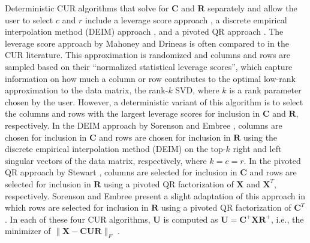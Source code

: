 \documentclass[12pt]{article}
\begin{document}
Deterministic CUR algorithms that solve for $\mathbf{C}$ and $\mathbf{R}$ separately and allow the user to select $c$ and $r$ include a leverage score approach \cite{mahoney_drineas_2009}, a discrete empirical interpolation method (DEIM) approach \cite{sorenson_embree_2016}, and a pivoted QR approach \cite{stewart_1999}.  The leverage score approach by Mahoney and Drineas \cite{mahoney_drineas_2009} is often compared to in the CUR literature. This approximation is randomized and columns and rows are sampled based on their ``normalized statistical leverage scores'', which capture information on how much a column or row contributes to the optimal low-rank approximation to the data matrix, the rank-$k$ SVD, where $k$ is a rank parameter chosen by the user.  However, a deterministic variant of this algorithm is to select the columns and rows with the largest leverage scores for inclusion in $\mathbf{C}$ and $\mathbf{R}$, respectively.  In the DEIM approach by Sorenson and Embree \cite{sorenson_embree_2016}, columns are chosen for inclusion in $\mathbf{C}$ and rows are chosen for inclusion in $\mathbf{R}$ using the discrete empirical interpolation method (DEIM) on the top-$k$ right and left singular vectors of the data matrix, respectively, where $k=c=r$.  In the pivoted QR approach by Stewart \cite{stewart_1999}, columns are selected for inclusion in $\mathbf{C}$ and rows are selected for inclusion in $\mathbf{R}$ using a pivoted QR factorization of $\mathbf{X}$ and $\mathbf{X}^T$, respectively. Sorenson and Embree \cite{sorenson_embree_2016} present a slight adaptation of this approach in which rows are selected for inclusion in $\mathbf{R}$ using a pivoted QR factorization of $\mathbf{C}^T$.  In each of these four CUR algorithms, $\mathbf{U}$ is computed as $\mathbf{U = C^+XR^+}$, i.e., the minimizer of $\|\mathbf{X} - \mathbf{CUR} \|_F$ \cite{stewart_1999}. 
\end{document}
